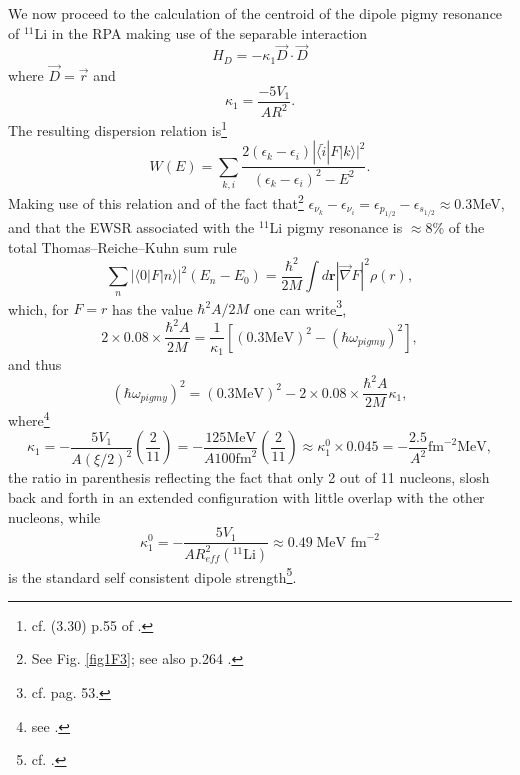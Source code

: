 We now proceed to the calculation of the centroid of the dipole pigmy resonance of $^{11}$Li in the RPA making use of the separable interaction
 \begin{equation}\label{eq2.F.6}
H_D=-\kappa_1\vec D\cdot\vec D
 \end{equation}
where $\vec D=\vec r$ and
 \begin{equation}
\kappa_1=\frac{-5V_1}{AR^2}.
 \end{equation}
The resulting dispersion relation is\footnote{cf. (3.30) p.55 of \cite{Bortignon:98}.}
\begin{equation}
W(E)=\sum_{k,i}\frac{2(\epsilon_k-\epsilon_i)|\langle \tilde i|F|k\rangle|^2}{(\epsilon_k-\epsilon_i)^2-E^2}.
\end{equation}
 Making use of this relation and of the fact that\footnote{See Fig. \ref{fig1F3}; see also  p.264 \cite{Brink:05}.} 
 $\epsilon_{\nu_k}-\epsilon_{\nu_i}=\epsilon_{p_{1/2}}-\epsilon_{s_{1/2}}\approx 0.3 $MeV, and that the EWSR associated with the $^{11}$Li pigmy resonance is $\approx 8$\% of the total Thomas--Reiche--Kuhn sum rule
 \begin{equation}
\sum_n |\langle0|F|n\rangle|^2(E_n-E_0)=\frac{\hbar^2}{2M}\int d\mathbf r |\vec\nabla F|^2 \rho(r),
 \end{equation}
 which, for $F=r$ has the value $\hbar^2 A/2M$ one can write\footnote{cf. \cite{Bertsch:05} pag. 53.}, 
\begin{equation*}
2\times 0.08\times \frac{\hbar^2A}{2M}=\frac{1}{\kappa_1}[(0.3\text{MeV})^2-(\hbar \omega_{pigmy})^2],
\end{equation*}
 and thus
\begin{equation*}
 (\hbar\omega_{pigmy})^2=(0.3 \text{MeV})^2-2\times 0.08\times\frac{\hbar^2A}{2M}\kappa_1,
\end{equation*}
 where\footnote{see \cite{Bortignon:98}.}
\begin{equation*}
\kappa_1=-\frac{5V_1}{A(\xi/2)^2}\left(\frac{2}{11}\right)=-\frac{125\text{MeV}}{A 100 \text{fm}^2}\left(\frac{2}{11}\right)\approx \kappa_1^0\times 0.045= -\frac{2.5}{A^2}\text{fm}^{-2}\text{MeV},
\end{equation*}
the ratio in parenthesis reflecting the fact that only 2 out of 11 nucleons, slosh back and forth in an extended configuration with little overlap with the other nucleons, while
\begin{equation}
\kappa_1^0=-\frac{5V_1}{AR^2_{eff}(^{11}\text{Li})}\approx 0.49\; \text{MeV fm}^{-2}
\end{equation}
is the standard self consistent dipole strength\footnote{cf. \cite{Bohr:75}.}.

